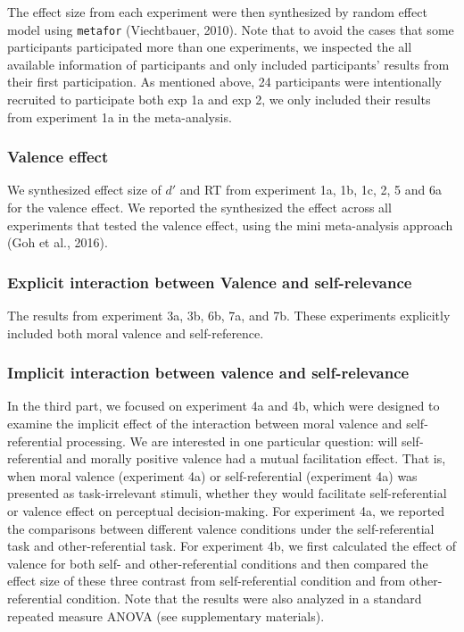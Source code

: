 \documentclass[
  english,
  man]{apa6}
\begin{document}
The effect size from each experiment were then synthesized by random effect model using \texttt{metafor} (Viechtbauer, 2010). Note that to avoid the cases that some participants participated more than one experiments, we inspected the all available information of participants and only included participants' results from their first participation. As mentioned above, 24 participants were intentionally recruited to participate both exp 1a and exp 2, we only included their results from experiment 1a in the meta-analysis.

\hypertarget{valence-effect}{%
\subsubsection{Valence effect}\label{valence-effect}}

We synthesized effect size of \(d'\) and RT from experiment 1a, 1b, 1c, 2, 5 and 6a for the valence effect. We reported the synthesized the effect across all experiments that tested the valence effect, using the mini meta-analysis approach (Goh et al., 2016).

\hypertarget{explicit-interaction-between-valence-and-self-relevance}{%
\subsubsection{Explicit interaction between Valence and self-relevance}\label{explicit-interaction-between-valence-and-self-relevance}}

The results from experiment 3a, 3b, 6b, 7a, and 7b. These experiments explicitly included both moral valence and self-reference.

\hypertarget{implicit-interaction-between-valence-and-self-relevance}{%
\subsubsection{Implicit interaction between valence and self-relevance}\label{implicit-interaction-between-valence-and-self-relevance}}

In the third part, we focused on experiment 4a and 4b, which were designed to examine the implicit effect of the interaction between moral valence and self-referential processing. We are interested in one particular question: will self-referential and morally positive valence had a mutual facilitation effect. That is, when moral valence (experiment 4a) or self-referential (experiment 4a) was presented as task-irrelevant stimuli, whether they would facilitate self-referential or valence effect on perceptual decision-making. For experiment 4a, we reported the comparisons between different valence conditions under the self-referential task and other-referential task. For experiment 4b, we first calculated the effect of valence for both self- and other-referential conditions and then compared the effect size of these three contrast from self-referential condition and from other-referential condition. Note that the results were also analyzed in a standard repeated measure ANOVA (see supplementary materials).
\end{document}
